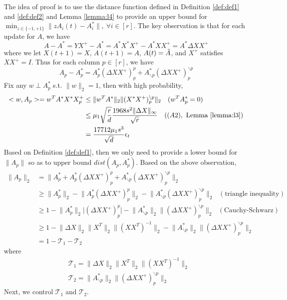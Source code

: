 The idea of proof is to use the distance function defined in Definition \ref{def:def1} and \ref{def:def2} and Lemma \ref{lemma:l4} to provide an upper bound for $\min_{z\in \{-1,+1\}}\lVert zA_i(t)-A_i^*\rVert,~\forall i \in [r]$.
The key observation is that for each update for $A$, we have
\begin{equation*}
    A-A^*=YX^+-A^*=A^*X^*X^+-A^*XX^+=A^*\Delta XX^+
\end{equation*}
where we let $X(t+1)=X$, $A(t+1)=A$, $A(t)=\Tilde{A}$, and $X^+$ satisfies $XX^+=I$.
Thus for each column $p\in[r]$, we have
\begin{equation*}
    A_p-A_p^*=A_p^*(\Delta XX^+)_p^p+A_{\backslash p}^*(\Delta XX^+)_p^{\backslash p}
\end{equation*}
Fix any $w\perp A_p^*$ s.t. $\lVert w\rVert_2=1$, then with high probability,
\begin{align*}
    <w,A_p>=w^TA^*X^*X^+_p &\leq \lVert w^TA^*\rVert_2 \lVert (X^*X^+)_p^{\backslash p}\rVert_2~~~(w^TA^*_p=0)\\
    &\leq \mu_1\sqrt{\frac{r}{d}}\frac{1968s^2\lVert \Delta X \rVert_{\infty}}{\sqrt{r}}~~~((A2),~\text{Lemma \ref{lemma:l3})}\\
    &=\frac{17712\mu_1s^3}{\sqrt{d}}\epsilon_t
\end{align*}
Based on Definition \ref{def:def1}, then we only need to provide a lower bound for $\lVert A_p \rVert$ so as to upper bound $dist(A_p,A_p^*)$. Based on the above observation,
\begin{align*}
    \lVert A_p \rVert_2 &=\lVert A_p^*+A_p^*(\Delta XX^+)_p^p+A_{\backslash p}^*(\Delta XX^+)_p^{\backslash p}\rVert_2\\
    &\geq \lVert A_p^*\rVert_2 -\lVert A_p^*(\Delta XX^+)_p^p\rVert_2-\lVert A_{\backslash p}^*(\Delta XX^+)_p^{\backslash p}\rVert_2~~~(\text{triangle inequality})\\
    &\geq 1-\lVert A_p^* \rVert_2\lvert (\Delta XX^+)_p^p \rvert -\lVert A_{\backslash p}^*\rVert_2\lVert(\Delta XX^+)_p^{\backslash p}\rVert_2~~~(\text{Cauchy-Schwarz})\\
    &\geq 1-\lVert \Delta X \rVert_2\lVert X^T \rVert_2 \lVert (XX^T)^{-1}\rVert_2-\lVert A_{\backslash p}^*\rVert_2\lVert(\Delta XX^+)_p^{\backslash p}\rVert_2\\
    &=1-\mathcal{T}_1-\mathcal{T}_2
\end{align*}
where
\begin{align*}
    &\mathcal{T}_1=\lVert \Delta X \rVert_2\lVert X^T \rVert_2 \lVert (XX^T)^{-1}\rVert_2\\
    &\mathcal{T}_2=\lVert A_{\backslash p}^*\rVert_2\lVert(\Delta XX^+)_p^{\backslash p}\rVert_2
\end{align*}
Next, we control $\mathcal{T}_1$ and $\mathcal{T}_2$.

